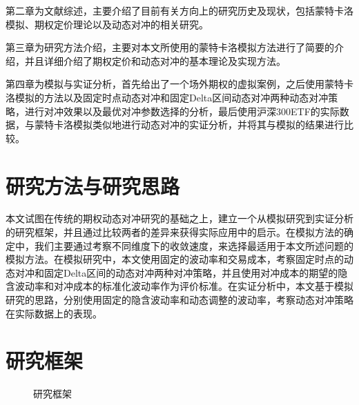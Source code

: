 第二章为文献综述，主要介绍了目前有关方向上的研究历史及现状，包括蒙特卡洛模拟、期权定价理论以及动态对冲的相关研究。

第三章为研究方法介绍，主要对本文所使用的蒙特卡洛模拟方法进行了简要的介绍，并且详细介绍了期权定价和动态对冲的基本理论及实现方法。

第四章为模拟与实证分析，首先给出了一个场外期权的虚拟案例，之后使用蒙特卡洛模拟的方法以及固定时点动态对冲和固定Delta区间动态对冲两种动态对冲策略，进行对冲效果以及最优对冲参数选择的分析，最后使用沪深300ETF的实际数据，与蒙特卡洛模拟类似地进行动态对冲的实证分析，并将其与模拟的结果进行比较。

\section{研究方法与研究思路}

本文试图在传统的期权动态对冲研究的基础之上，建立一个从模拟研究到实证分析的研究框架，并且通过比较两者的差异来获得实际应用中的启示。在模拟方法的确定中，我们主要通过考察不同维度下的收敛速度，来选择最适用于本文所述问题的模拟方法。在模拟研究中，本文使用固定的波动率和交易成本，考察固定时点的动态对冲和固定Delta区间的动态对冲两种对冲策略，并且使用对冲成本的期望的隐含波动率和对冲成本的标准化波动率作为评价标准。在实证分析中，本文基于模拟研究的思路，分别使用固定的隐含波动率和动态调整的波动率，考察动态对冲策略在实际数据上的表现。

\newpage
\section{研究框架}

\begin{figure}[!htp]
    \centering
    \resizebox{6cm}{!}{}
    \caption{研究框架}
    \label{fig:flow_chart}
\end{figure}
